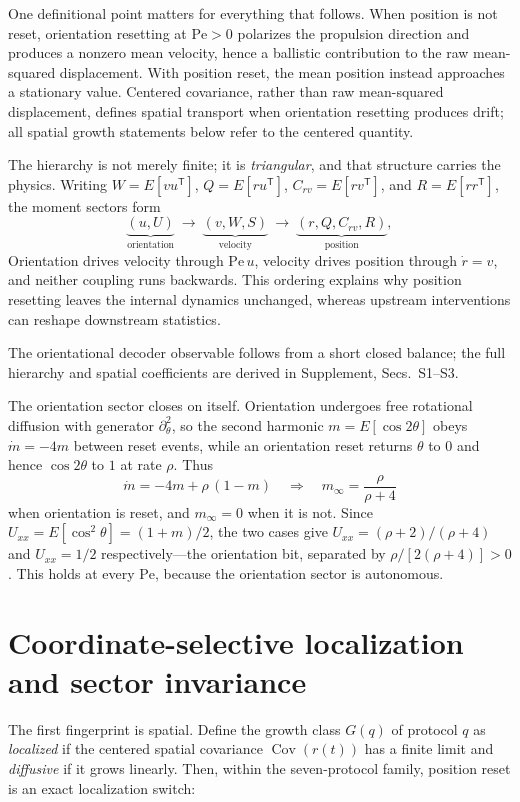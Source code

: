 One definitional point matters for everything that follows. When position is not reset, orientation resetting at $\mathrm{Pe}>0$ polarizes the propulsion direction and produces a nonzero mean velocity, hence a ballistic contribution to the raw mean-squared displacement. With position reset, the mean position instead approaches a stationary value. Centered covariance, rather than raw mean-squared displacement, defines spatial transport when orientation resetting produces drift; all spatial growth statements below refer to the centered quantity.

The hierarchy is not merely finite; it is \emph{triangular}, and that structure carries the physics. Writing $W=E[vu^\mathsf T]$, $Q=E[ru^\mathsf T]$, $C_{rv}=E[rv^\mathsf T]$, and $R=E[rr^\mathsf T]$, the moment sectors form
\[
\underbrace{(u,U)}_{\text{orientation}}\ \longrightarrow\
\underbrace{(v,W,S)}_{\text{velocity}}\ \longrightarrow\
\underbrace{(r,Q,C_{rv},R)}_{\text{position}},
\]
Orientation drives velocity through $\mathrm{Pe}\,u$, velocity drives position through $\dot r=v$, and neither coupling runs backwards. This ordering explains why position resetting leaves the internal dynamics unchanged, whereas upstream interventions can reshape downstream statistics.

The orientational decoder observable follows from a short closed balance; the full hierarchy and spatial coefficients are derived in Supplement, Secs.~S1--S3.

The orientation sector closes on itself. Orientation undergoes free rotational diffusion with generator $\partial_\theta^2$, so the second harmonic $m=E[\cos2\theta]$ obeys $\dot m=-4m$ between reset events, while an orientation reset returns $\theta$ to $0$ and hence $\cos2\theta$ to $1$ at rate $\rho$. Thus
\[
\dot m=-4m+\rho\,(1-m)
\quad\Rightarrow\quad
m_\infty=\frac{\rho}{\rho+4}
\]
when orientation is reset, and $m_\infty=0$ when it is not. Since $U_{xx}=E[\cos^2\theta]=(1+m)/2$, the two cases give $U_{xx}=(\rho+2)/(\rho+4)$ and $U_{xx}=1/2$ respectively---the orientation bit, separated by $\rho/[2(\rho+4)]>0$. This holds at every $\mathrm{Pe}$, because the orientation sector is autonomous.

\section{Coordinate-selective localization and sector invariance}\label{localization-sector-invariance}

The first fingerprint is spatial. Define the growth class $G(q)$ of protocol $q$ as \emph{localized} if the centered spatial covariance $\operatorname{Cov}(r(t))$ has a finite limit and \emph{diffusive} if it grows linearly. Then, within the seven-protocol family, position reset is an exact localization switch:

